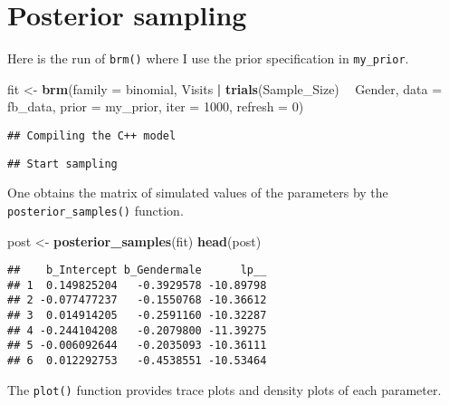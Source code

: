 \documentclass[
]{book}
\newenvironment{Shaded}{\begin{snugshade}}{\end{snugshade}}
\newcommand{\DataTypeTok}[1]{\textcolor[rgb]{0.13,0.29,0.53}{#1}}
\newcommand{\DecValTok}[1]{\textcolor[rgb]{0.00,0.00,0.81}{#1}}
\newcommand{\KeywordTok}[1]{\textcolor[rgb]{0.13,0.29,0.53}{\textbf{#1}}}
\newcommand{\NormalTok}[1]{#1}
\newcommand{\OperatorTok}[1]{\textcolor[rgb]{0.81,0.36,0.00}{\textbf{#1}}}
\newcommand{\StringTok}[1]{\textcolor[rgb]{0.31,0.60,0.02}{#1}}
\begin{document}
\hypertarget{posterior-sampling}{%
\section{Posterior sampling}\label{posterior-sampling}}

Here is the run of \texttt{brm()} where I use the prior specification in \texttt{my\_prior}.

\begin{Shaded}
\begin{Highlighting}[]
\NormalTok{fit <-}\StringTok{ }\KeywordTok{brm}\NormalTok{(}\DataTypeTok{family =}\NormalTok{ binomial,}
\NormalTok{           Visits }\OperatorTok{|}\StringTok{ }\KeywordTok{trials}\NormalTok{(Sample_Size) }\OperatorTok{~}\StringTok{ }\NormalTok{Gender,}
           \DataTypeTok{data =}\NormalTok{ fb_data,}
           \DataTypeTok{prior =}\NormalTok{ my_prior,}
           \DataTypeTok{iter =} \DecValTok{1000}\NormalTok{,}
           \DataTypeTok{refresh =} \DecValTok{0}\NormalTok{)}
\end{Highlighting}
\end{Shaded}

\begin{verbatim}
## Compiling the C++ model
\end{verbatim}

\begin{verbatim}
## Start sampling
\end{verbatim}

One obtains the matrix of simulated values of the parameters by the \texttt{posterior\_samples()} function.

\begin{Shaded}
\begin{Highlighting}[]
\NormalTok{post <-}\StringTok{ }\KeywordTok{posterior_samples}\NormalTok{(fit)}
\KeywordTok{head}\NormalTok{(post)}
\end{Highlighting}
\end{Shaded}

\begin{verbatim}
##    b_Intercept b_Gendermale      lp__
## 1  0.149825204   -0.3929578 -10.89798
## 2 -0.077477237   -0.1550768 -10.36612
## 3  0.014914205   -0.2591160 -10.32287
## 4 -0.244104208   -0.2079800 -11.39275
## 5 -0.006092644   -0.2035093 -10.36111
## 6  0.012292753   -0.4538551 -10.53464
\end{verbatim}

The \texttt{plot()} function provides trace plots and density plots of each parameter.
\end{document}
